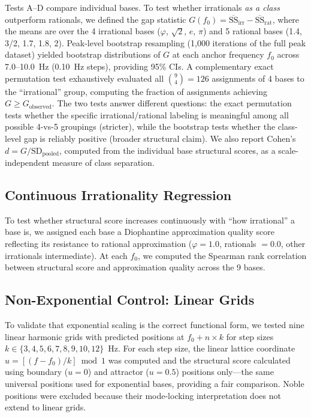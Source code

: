 \documentclass[11pt,a4paper]{article}
\newcommand{\phisym}{\varphi}
\begin{document}
Tests A--D compare individual bases. To test whether irrationals \emph{as a class} outperform rationals, we defined the gap statistic $G(f_0) = \overline{\text{SS}}_{\text{irr}} - \overline{\text{SS}}_{\text{rat}}$, where the means are over the 4 irrational bases ($\phisym$, $\sqrt{2}$, $e$, $\pi$) and 5 rational bases (1.4, 3/2, 1.7, 1.8, 2). Peak-level bootstrap resampling (1,000 iterations of the full peak dataset) yielded bootstrap distributions of $G$ at each anchor frequency $f_0$ across 7.0--10.0~Hz (0.10~Hz steps), providing 95\% CIs. A complementary exact permutation test exhaustively evaluated all $\binom{9}{4} = 126$ assignments of 4 bases to the ``irrational'' group, computing the fraction of assignments achieving $G \geq G_{\text{observed}}$. The two tests answer different questions: the exact permutation tests whether the specific irrational/rational labeling is meaningful among all possible 4-vs-5 groupings (stricter), while the bootstrap tests whether the class-level gap is reliably positive (broader structural claim). We also report Cohen's $d = G / \text{SD}_{\text{pooled}}$, computed from the individual base structural scores, as a scale-independent measure of class separation.

\subsection{Continuous Irrationality Regression}
\label{sec:regression}

To test whether structural score increases continuously with ``how irrational'' a base is, we assigned each base a Diophantine approximation quality score reflecting its resistance to rational approximation ($\phisym = 1.0$, rationals $= 0.0$, other irrationals intermediate). At each $f_0$, we computed the Spearman rank correlation between structural score and approximation quality across the 9 bases.

\subsection{Non-Exponential Control: Linear Grids}
\label{sec:linear_control}

To validate that exponential scaling is the correct functional form, we tested nine linear harmonic grids with predicted positions at $f_0 + n \times k$ for step sizes $k \in \{3, 4, 5, 6, 7, 8, 9, 10, 12\}$~Hz. For each step size, the linear lattice coordinate $u = [(f - f_0)/k] \bmod 1$ was computed and the structural score calculated using boundary ($u = 0$) and attractor ($u = 0.5$) positions only---the same universal positions used for exponential bases, providing a fair comparison. Noble positions were excluded because their mode-locking interpretation does not extend to linear grids.
\end{document}
